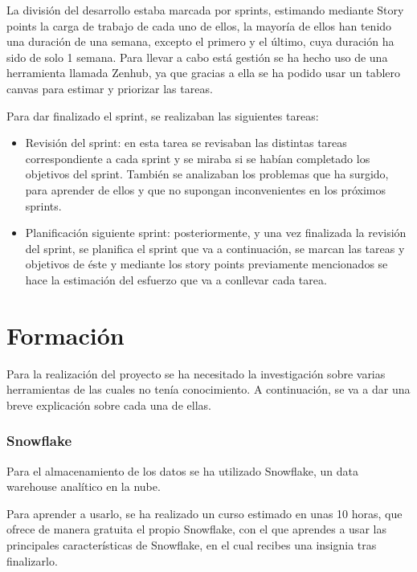 La división del desarrollo estaba marcada por sprints, estimando mediante Story points la carga de trabajo de cada uno de ellos, la mayoría de ellos han tenido una duración de una semana, excepto el primero y el último, cuya duración ha sido de solo 1 semana. Para llevar a cabo está gestión se ha hecho uso de una herramienta llamada Zenhub, ya que gracias a ella se ha podido usar un tablero canvas para estimar y priorizar las tareas.

Para dar finalizado el sprint, se realizaban las siguientes tareas:

\begin{itemize}\tightlist
    \item Revisión del sprint: en esta tarea se revisaban las distintas tareas correspondiente a cada sprint y se miraba si se habían completado los objetivos del sprint. También se analizaban los problemas que ha surgido, para aprender de ellos y que no supongan inconvenientes en los próximos sprints.
    
    \item Planificación siguiente sprint: posteriormente, y una vez finalizada la revisión del sprint, se planifica el sprint que va a continuación, se marcan las tareas y objetivos de éste y mediante los story points previamente mencionados se hace la estimación del esfuerzo que va a conllevar cada tarea.
    
\end{itemize}

\section{Formación}

Para la realización del proyecto se ha necesitado la investigación sobre varias herramientas de las cuales no tenía conocimiento. A continuación, se va a dar una breve explicación sobre cada una de ellas.

\subsubsection{Snowflake}

Para el almacenamiento de los datos se ha utilizado Snowflake, un data warehouse analítico en la nube.

Para aprender a usarlo, se ha realizado un curso estimado en unas 10 horas, que ofrece de manera gratuita el propio Snowflake, con el que aprendes a usar las principales características de Snowflake, en el cual recibes una insignia tras finalizarlo.

